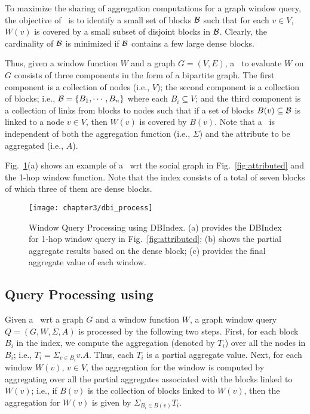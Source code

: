 To maximize the sharing of aggregation computations for a graph window query, 
the objective of \DBIndex\ is to identify a small set of blocks ${\cal B}$ such that
for each $v \in V$, $W(v)$ is covered by a small subset of disjoint blocks in ${\cal B}$.
Clearly, the cardinality of ${\cal B}$ is minimized if ${\cal B}$ contains a few large dense blocks.

Thus, given a window function $W$ and a graph $G=(V,E)$,
a \DBIndex\ to evaluate $W$ on $G$ consists of three components in the form of a bipartite graph.
The first component is a collection of nodes (i.e., $V$);
the second component is a collection of blocks; i.e., ${\cal B} = \{B_1,\cdots,B_n\}$ where each $B_i \subseteq V$;
and the third component is a collection of links from blocks to nodes
such that if a set of blocks $B(v) \subseteq {\cal B}$ is linked to a node $v \in V$,
then $W(v)$ is covered by $B(v)$.
Note that a \DBIndex\ is independent of both the aggregation function (i.e., $\Sigma$) and the attribute to be aggregated (i.e., $A$).

Fig.~\ref{fig:dbi_agg}(a) shows an example of a \DBIndex\ wrt the social graph in Fig.~\ref{fig:attributed} and the 1-hop window function.
Note that the index consists of a total of seven blocks of which three of them are dense blocks.

\begin{figure}[t]
\centerline{
	\texttt{[image: chapter3/dbi\_process]} 
	}
	\caption{Window Query Processing using DBIndex. (a) provides the DBIndex for 1-hop window query in Fig.~\ref{fig:attributed}; (b) shows the partial aggregate results based on the dense block; (c) provides the final aggregate value of each window. }
	\label{fig:dbi_agg}
\end{figure}

\subsection{Query Processing using \DBIndex}
Given a \DBIndex\ wrt a graph $G$ and a window function $W$, a graph window query $Q = (G, W, \Sigma, A)$ is processed by the following two steps.
First, for each block $B_i$ in the index, we compute the aggregation (denoted by $T_i$) over all the nodes in $B_i$;
i.e., $T_i = \Sigma_{v \in B_i} v.A$. 
Thus, each $T_i$ is a partial aggregate value.
Next, for each window $W(v)$, $v \in V$, the aggregation for the window is computed by aggregating over all the partial aggregates
associated with the blocks linked to $W(v)$;
i.e., if $B(v)$ is the collection of blocks linked to $W(v)$, 
then the aggregation for $W(v)$ is given by $\Sigma_{B_i \in B(v)} T_i$. 

